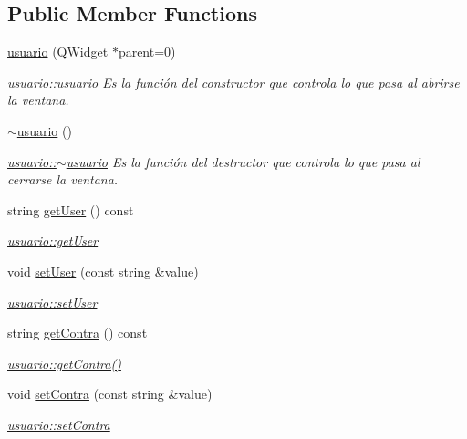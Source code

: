 \subsection*{Public Member Functions}
\begin{DoxyCompactItemize}
\item 
\hyperlink{classusuario_a34821186e90424c9105221fb931e9ca0}{usuario} (Q\+Widget $\ast$parent=0)
\begin{DoxyCompactList}\small\item\em \hyperlink{classusuario_a34821186e90424c9105221fb931e9ca0}{usuario\+::usuario} Es la función del constructor que controla lo que pasa al abrirse la ventana. \end{DoxyCompactList}\item 
\hyperlink{classusuario_aa70d0ad5fba6586c37b429b1806ff672}{$\sim$usuario} ()
\begin{DoxyCompactList}\small\item\em \hyperlink{classusuario_aa70d0ad5fba6586c37b429b1806ff672}{usuario\+::$\sim$usuario} Es la función del destructor que controla lo que pasa al cerrarse la ventana. \end{DoxyCompactList}\item 
string \hyperlink{classusuario_a0a32493a53b4aed9d66662f8e6839889}{get\+User} () const
\begin{DoxyCompactList}\small\item\em \hyperlink{classusuario_a0a32493a53b4aed9d66662f8e6839889}{usuario\+::get\+User} \end{DoxyCompactList}\item 
void \hyperlink{classusuario_a0dc83a4f7544e487109854604f167e94}{set\+User} (const string \&value)
\begin{DoxyCompactList}\small\item\em \hyperlink{classusuario_a0dc83a4f7544e487109854604f167e94}{usuario\+::set\+User} \end{DoxyCompactList}\item 
string \hyperlink{classusuario_ae8abb797a4efda6053b2c15936ba9792}{get\+Contra} () const
\begin{DoxyCompactList}\small\item\em \hyperlink{classusuario_ae8abb797a4efda6053b2c15936ba9792}{usuario\+::get\+Contra()} \end{DoxyCompactList}\item 
void \hyperlink{classusuario_a8e027d694579ff05152cc77c50886111}{set\+Contra} (const string \&value)
\begin{DoxyCompactList}\small\item\em \hyperlink{classusuario_a8e027d694579ff05152cc77c50886111}{usuario\+::set\+Contra} \end{DoxyCompactList}\end{DoxyCompactItemize}



